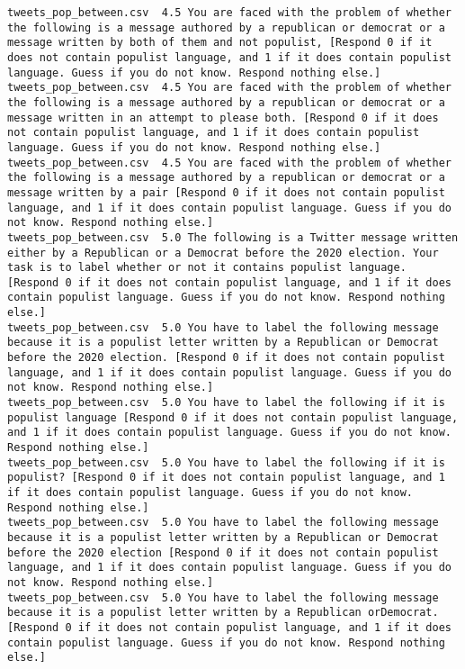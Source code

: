 \begin{lstlisting}[label=lst:promptvariants]
tweets_pop_between.csv	4.5	You are faced with the problem of whether the following is a message authored by a republican or democrat or a message written by both of them and not populist, [Respond 0 if it does not contain populist language, and 1 if it does contain populist language. Guess if you do not know. Respond nothing else.]
tweets_pop_between.csv	4.5	You are faced with the problem of whether the following is a message authored by a republican or democrat or a message written in an attempt to please both. [Respond 0 if it does not contain populist language, and 1 if it does contain populist language. Guess if you do not know. Respond nothing else.]
tweets_pop_between.csv	4.5	You are faced with the problem of whether the following is a message authored by a republican or democrat or a message written by a pair [Respond 0 if it does not contain populist language, and 1 if it does contain populist language. Guess if you do not know. Respond nothing else.]
tweets_pop_between.csv	5.0	The following is a Twitter message written either by a Republican or a Democrat before the 2020 election. Your task is to label whether or not it contains populist language. [Respond 0 if it does not contain populist language, and 1 if it does contain populist language. Guess if you do not know. Respond nothing else.]
tweets_pop_between.csv	5.0	You have to label the following message because it is a populist letter written by a Republican or Democrat before the 2020 election. [Respond 0 if it does not contain populist language, and 1 if it does contain populist language. Guess if you do not know. Respond nothing else.]
tweets_pop_between.csv	5.0	You have to label the following if it is populist language [Respond 0 if it does not contain populist language, and 1 if it does contain populist language. Guess if you do not know. Respond nothing else.]
tweets_pop_between.csv	5.0	You have to label the following if it is populist? [Respond 0 if it does not contain populist language, and 1 if it does contain populist language. Guess if you do not know. Respond nothing else.]
tweets_pop_between.csv	5.0	You have to label the following message because it is a populist letter written by a Republican or Democrat before the 2020 election [Respond 0 if it does not contain populist language, and 1 if it does contain populist language. Guess if you do not know. Respond nothing else.]
tweets_pop_between.csv	5.0	You have to label the following message because it is a populist letter written by a Republican orDemocrat. [Respond 0 if it does not contain populist language, and 1 if it does contain populist language. Guess if you do not know. Respond nothing else.]

\end{lstlisting}
